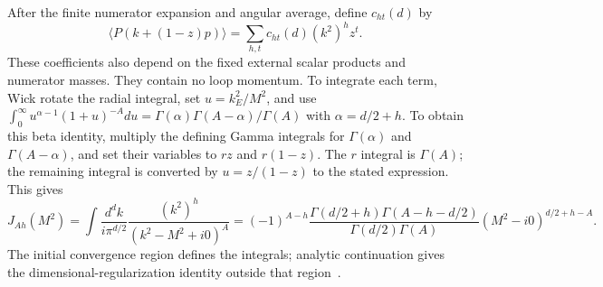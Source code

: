 After the finite numerator expansion and angular average, define $c_{ht}(d)$ by
\begin{equation}
 \langle P(k+(1-z)p)\rangle=\sum_{h,t}c_{ht}(d)(k^2)^h z^t.
 \label{eq:light-polynomial}
\end{equation}
These coefficients also depend on the fixed external scalar products and numerator masses. They contain no loop momentum. To integrate each term, Wick rotate the radial integral, set $u=k_E^2/M^2$, and use
$\int_0^\infty u^{\alpha-1}(1+u)^{-A}du=\Gamma(\alpha)\Gamma(A-\alpha)/\Gamma(A)$ with $\alpha=d/2+h$. To obtain this beta identity, multiply the defining Gamma integrals for $\Gamma(\alpha)$ and $\Gamma(A-\alpha)$, and set their variables to $rz$ and $r(1-z)$. The $r$ integral is $\Gamma(A)$; the remaining integral is converted by $u=z/(1-z)$ to the stated expression. This gives
\begin{equation}
 J_{Ah}(M^2)=\int\frac{d^dk}{i\pi^{d/2}}\frac{(k^2)^h}{(k^2-M^2+i0)^A}
 =(-1)^{A-h}\frac{\Gamma(d/2+h)\Gamma(A-h-d/2)}{\Gamma(d/2)\Gamma(A)}
 (M^2-i0)^{d/2+h-A}.
 \label{eq:light-radial}
\end{equation}
The initial convergence region defines the integrals; analytic continuation gives the dimensional-regularization identity outside that region~\cite{Weinzierl2022}.

